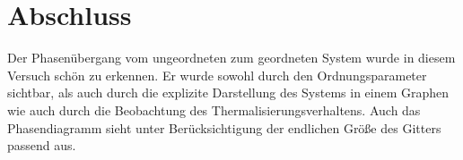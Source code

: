 \documentclass[12pt]{article}
\begin{document}
\section*{Abschluss}
Der Phasenübergang vom ungeordneten zum geordneten System wurde in diesem Versuch schön zu erkennen. Er wurde sowohl durch den Ordnungsparameter sichtbar, als auch durch die explizite Darstellung des Systems in einem Graphen wie auch durch die Beobachtung des Thermalisierungsverhaltens.
Auch das Phasendiagramm sieht unter Berücksichtigung der endlichen Größe des Gitters passend aus.
\end{document}
